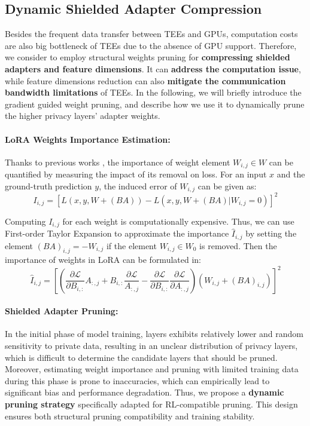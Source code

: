 \documentclass{article}
\begin{document}
\subsection{Dynamic Shielded Adapter Compression}
Besides the frequent data transfer between TEEs and GPUs, computation costs are also big bottleneck of TEEs due to the absence of GPU support. Therefore, we consider to employ structural weights pruning for \textbf{compressing shielded adapters and feature dimensions}. It can \textbf{address the computation issue}, while feature dimensions reduction can also \textbf{mitigate the communication bandwidth limitations} of TEEs.
In the following, we will briefly introduce the gradient guided weight pruning, and describe how we use it to dynamically prune the higher privacy layers' adapter weights. 

\paragraph{LoRA Weights Importance Estimation:}
Thanks to previous works \cite{zhang2023loraprune,ma2023llm_prune,molchanov2019pruning}, the importance of weight element $W_{i,j} \in W$ can be quantified by measuring the impact of its removal on loss. For an input $x$ and the ground-truth prediction $y$, the induced error of $W_{i,j}$ can be given as:
\begin{equation}
    I_{i,j} = \left[ L(x,y,W+(BA)) - L(x,y,W+(BA) | W_{i,j} = 0) \right]^2
\end{equation}

Computing $I_{i,j}$ for each weight is computationally expensive. Thus, we can use First-order Taylor Expansion to approximate the importance $\hat{I}_{i,j}$ by setting the element $(BA)_{i,j} = -W_{i,j}$ if the element $W_{i,j} \in W_0$ is removed. Then the importance of weights in LoRA can be formulated in:
\begin{equation}
       \hat{I}_{i,j} = [(\frac{\partial\mathcal{L}}{\partial B_{i,:}}A_{:,j}+B_{i,:}\frac{\partial\mathcal{L}}{A_{:,j}}-\frac{\partial\mathcal{L}}{\partial B_{i,:}}\frac{\partial\mathcal{L}}{\partial A_{:,j}})(W_{i,j}+(BA)_{i,j})]^2
\end{equation}

\paragraph{Shielded Adapter Pruning:}
In the initial phase of model training, layers exhibits relatively lower and random sensitivity to private data, resulting in an unclear distribution of privacy layers, which is difficult to determine the candidate layers that should be pruned. Moreover, estimating weight importance and pruning with limited training data during this phase is prone to inaccuracies, which can empirically lead to significant bias and performance degradation. Thus, we propose a \textbf{dynamic pruning strategy} specifically adapted for RL-compatible pruning. This design ensures both structural pruning compatibility and training stability.
\end{document}
